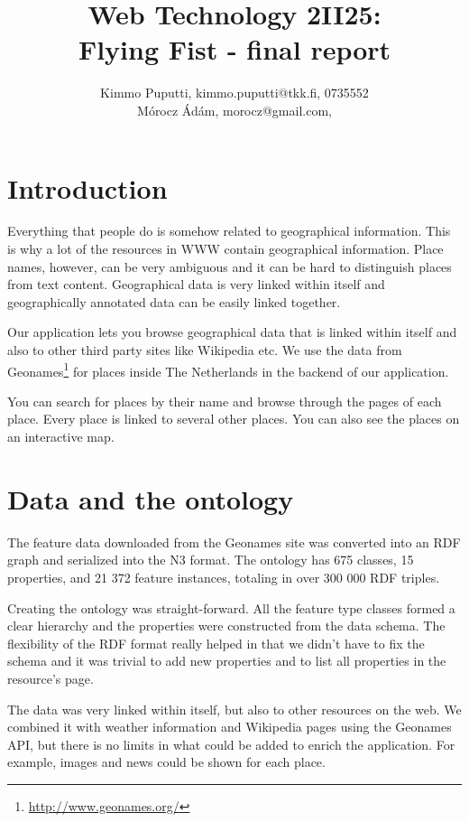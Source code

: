\documentclass[a4paper,12pt]{article}
\title{Web Technology 2II25:\\Flying Fist - final report}
\author{Kimmo Puputti, kimmo.puputti@tkk.fi, 0735552\\M\'orocz \'Ad\'am, morocz@gmail.com, }
\begin{document}
\maketitle

\section{Introduction}

Everything that people do is somehow related to geographical
information. This is why a lot of the resources in WWW contain
geographical information. Place names, however, can be very ambiguous
and it can be hard to distinguish places from text
content. Geographical data is very linked within itself and
geographically annotated data can be easily linked together.

Our application lets you browse geographical data that is linked
within itself and also to other third party sites like Wikipedia
etc. We use the data from
Geonames\footnote{\url{http://www.geonames.org/}} for places inside
The Netherlands in the backend of our application.

You can search for places by their name and browse through the pages
of each place. Every place is linked to several other places. You can
also see the places on an interactive map.

\section{Data and the ontology}

The feature data downloaded from the Geonames site was converted into
an RDF graph and serialized into the N3 format. The ontology has 675
classes, 15 properties, and 21 372 feature instances, totaling in over
300 000 RDF triples.

Creating the ontology was straight-forward. All the feature type
classes formed a clear hierarchy and the properties were constructed
from the data schema. The flexibility of the RDF format really helped
in that we didn't have to fix the schema and it was trivial to add new
properties and to list all properties in the resource's page.

The data was very linked within itself, but also to other resources on
the web. We combined it with weather information and Wikipedia pages
using the Geonames API, but there is no limits in what could be added
to enrich the application. For example, images and news could be shown
for each place.
\end{document}
